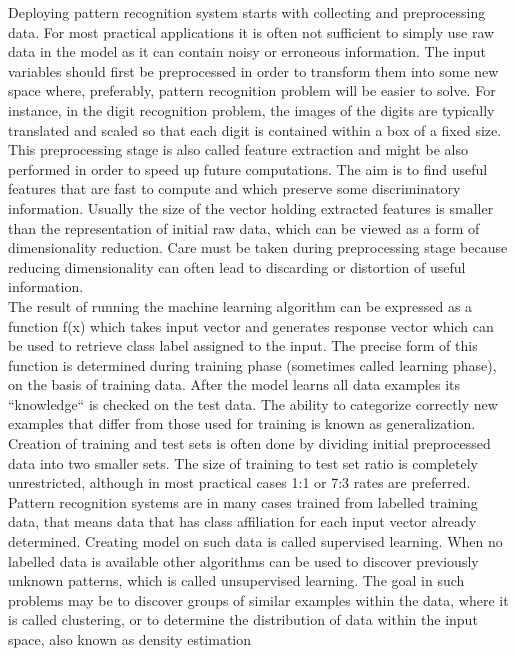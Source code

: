 Deploying pattern recognition system starts with collecting and preprocessing data. For most practical applications it is often not sufficient to simply use raw data in the model as it can contain noisy or erroneous information. The input variables should first be preprocessed in order to transform them into some new space where, preferably, pattern recognition problem will be easier to solve. For instance, in the digit recognition problem, the images of the digits are typically translated and scaled so that each
digit is contained within a box of a fixed size. This preprocessing stage is also called feature extraction and might be also performed in order to speed up future computations. The aim is to find useful features that are fast to compute and which preserve some discriminatory information. Usually the size of the vector holding extracted features is smaller than the representation of initial raw data, which can be viewed as a form of dimensionality reduction. Care must be taken during preprocessing stage because reducing dimensionality can often lead to discarding or distortion of useful information. \\

The result of running the machine learning algorithm can be expressed as a function f(x) which takes input vector and generates response vector which can be used to retrieve class label assigned to the input. The precise form of this function is determined during training phase (sometimes called learning phase), on the basis of training data. After the model learns all data examples its ``knowledge`` is checked on the test data. The ability to categorize correctly new examples that differ from those used for training is known as generalization. Creation of training and test sets is often done by dividing initial preprocessed data into two smaller sets. The size of training to test set ratio is completely unrestricted, although in most practical cases 1:1 or 7:3 rates are preferred. Pattern recognition systems are in many cases trained from labelled training data, that means data that has class affiliation for each input vector already determined. Creating model on such data is called supervised learning. When no labelled data is available other algorithms can be used to discover previously unknown patterns, which is called unsupervised learning. The goal in such problems may be to discover groups of similar examples within the data, where it is called clustering, or to determine the distribution of data within the input space, also known as density estimation \\